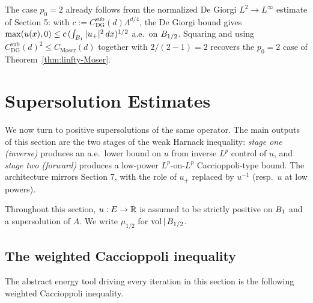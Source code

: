 \begin{remark}[$p_0 = 2$ anchor, \leanname{linfty\_subsolution\_Moser\_two}]
The case $p_0 = 2$ already follows from the normalized De Giorgi $L^2 \to
L^\infty$ estimate of Section 5: with $c := C_{\mathrm{DG}}^{\mathrm{sub}}(d)
\Lambda^{d/4}$, the De Giorgi bound gives
$\max(u(x),0) \leq c\,(\int_{B_{1}} |u_+|^{2}\,dx)^{1/2}$ a.e.\ on
$B_{1/2}$. Squaring and using
$C_{\mathrm{DG}}^{\mathrm{sub}}(d)^{2} \leq C_{\mathrm{Moser}}(d)$ together with
$2/(2-1) = 2$ recovers the $p_0=2$ case of Theorem~\ref{thm:linfty-Moser}.
\end{remark}


\section{Supersolution Estimates}

We now turn to positive supersolutions of the same operator. The main outputs
of this section are the two stages of the weak Harnack inequality:
\emph{stage one (inverse)} produces an a.e.\ lower bound on $u$ from inverse
$L^{p}$ control of $u$, and \emph{stage two (forward)} produces a low-power
$L^{p}$-on-$L^{p}$ Caccioppoli-type bound. The architecture mirrors Section 7,
with the role of $u_+$ replaced by $u^{-1}$ (resp.\ $u$ at low powers).

Throughout this section, $u : E \to \mathbb{R}$ is assumed to be strictly positive on
$B_{1}$ and a supersolution of $A$. We write $\mu_{1/2}$ for
$\mathrm{vol}\,|\,B_{1/2}$.

\subsection{The weighted Caccioppoli inequality}

The abstract energy tool driving every iteration in this section is the
following weighted Caccioppoli inequality.

